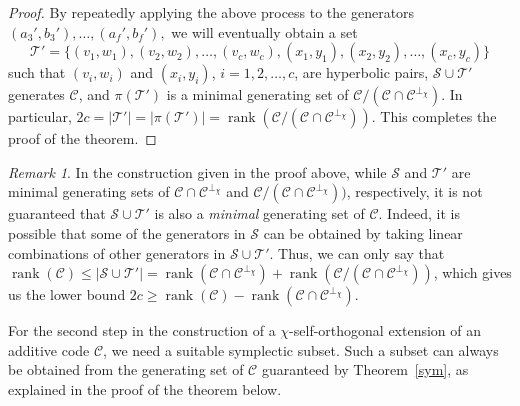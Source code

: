 \documentclass{article}
\DeclareMathOperator{\rank}{rank}
\theoremstyle{remark}
\newtheorem{rem}{Remark}[section]
\theoremstyle{definition}
\numberwithin{equation}{section}
\begin{document}
\begin{proof}
By repeatedly applying the above process to the generators $(a_3{'},b_3{'}),\ldots,(a_f{'},b_f{'}),$ we will eventually obtain a set 
 $$\mathcal{T}' = \{(v_1,w_1),(v_2,w_2),\ldots,(v_{c},w_{c}),(x_1,y_1),(x_2,y_2),\ldots, (x_{c},y_{c})\}$$ 
such that $(v_i,w_i)$ and $(x_i,y_i)$, $i=1,2,\ldots,c$, are hyperbolic pairs, $\mathcal{S} \cup \mathcal{T}'$ generates $\mathcal{C}$, and $\pi(\mathcal{T}')$ is a minimal generating set of $\mathcal{C}/(\mathcal{C} \cap \mathcal{C}^{\perp_\chi})$. In particular, $2c = |\mathcal{T}'| = |\pi(\mathcal{T}')| = \rank(\mathcal{C}/(\mathcal{C} \cap \mathcal{C}^{\perp_\chi}))$.
%
%
This completes the proof of the theorem. 
 \end{proof}
 
 \begin{rem} In the construction given in the proof above, while $\mathcal{S}$ and $\mathcal{T}'$ are minimal generating sets of $\mathcal{C} \cap \mathcal{C}^{\perp_\chi}$ and $\mathcal{C}/(\mathcal{C} \cap \mathcal{C}^{\perp_\chi}))$, respectively, it is not guaranteed that $\mathcal{S} \cup \mathcal{T}'$ is also a \emph{minimal} generating set of $\mathcal{C}$. Indeed, it is possible that some of the generators in $\mathcal{S}$ can be obtained by taking linear combinations of other generators in $\mathcal{S} \cup \mathcal{T}'$. Thus, we can only say that $\rank(\mathcal{C}) \le |\mathcal{S} \cup \mathcal{T}'| = \rank(\mathcal{C} \cap \mathcal{C}^{\perp_\chi}) + \rank(\mathcal{C}/(\mathcal{C} \cap \mathcal{C}^{\perp_\chi}))$, which gives us the lower bound $2c \ge \rank(\mathcal{C}) - \rank(\mathcal{C} \cap \mathcal{C}^{\perp_\chi})$.
\end{rem}
  
For the second step in the construction of a $\chi$-self-orthogonal extension of an additive code $\mathcal{C}$, we need a suitable symplectic subset. Such a subset can always be obtained from the  generating set of $\mathcal{C}$ guaranteed by Theorem~\ref{sym}, as explained in the proof of the theorem below.
  
\end{document}

